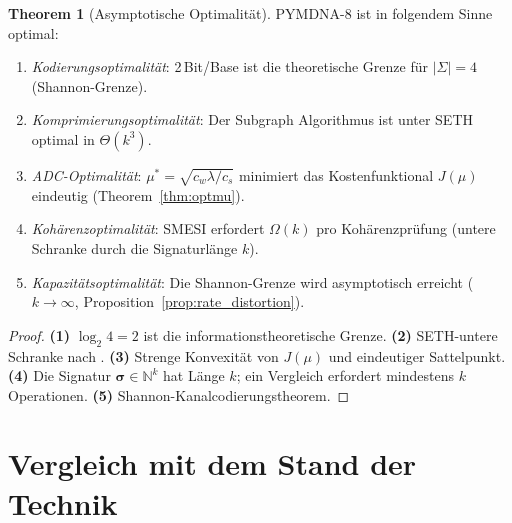 ﻿\documentclass[a4paper,12pt]{article}
\theoremstyle{definition}
\newtheorem{theorem}{Theorem}[section]
\begin{document}
\begin{theorem}[Asymptotische Optimalität]
  \label{thm:optimalitaet}
  PYMDNA-8 ist in folgendem Sinne optimal:
  \begin{enumerate}[noitemsep]
    \item \emph{Kodierungsoptimalität}: 2\,Bit/Base ist die theoretische Grenze
      für $|\Sigma| = 4$ (Shannon-Grenze).
    \item \emph{Komprimierungsoptimalität}: Der Subgraph Algorithmus ist unter
      SETH optimal in $\Theta(k^3)$.
    \item \emph{ADC-Optimalität}: $\mu^* = \sqrt{c_w \lambda / c_s}$ minimiert
      das Kostenfunktional $J(\mu)$ eindeutig (Theorem~\ref{thm:optmu}).
    \item \emph{Kohärenzoptimalität}: SMESI erfordert $\Omega(k)$ pro
      Kohärenzprüfung (untere Schranke durch die Signaturlänge $k$).
    \item \emph{Kapazitätsoptimalität}: Die Shannon-Grenze wird asymptotisch
      erreicht ($k \to \infty$, Proposition~\ref{prop:rate_distortion}).
  \end{enumerate}
\end{theorem}

\begin{proof}
  \textbf{(1)} $\log_2 4 = 2$ ist die informationstheoretische Grenze.
  \textbf{(2)} SETH-untere Schranke nach \cite{epp2026subgraph}.
  \textbf{(3)} Strenge Konvexität von $J(\mu)$ und eindeutiger Sattelpunkt.
  \textbf{(4)} Die Signatur $\boldsymbol{\sigma} \in \mathbb{N}^k$ hat
  Länge $k$; ein Vergleich erfordert mindestens $k$ Operationen.
  \textbf{(5)} Shannon-Kanalcodierungstheorem.
\end{proof}

\section{Vergleich mit dem Stand der Technik}
\end{document}
